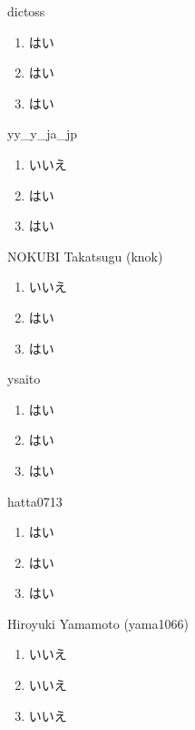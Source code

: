\begin{prework}{ dictoss }
  \begin{enumerate}
  \item はい
  \item はい
  \item はい
  \end{enumerate}
\end{prework}

\begin{prework}{ yy\_y\_ja\_jp }
  \begin{enumerate}
  \item いいえ
  \item はい
  \item はい
  \end{enumerate}
\end{prework}

\begin{prework}{ NOKUBI Takatsugu (knok) }
  \begin{enumerate}
  \item いいえ
  \item はい
  \item はい
  \end{enumerate}
\end{prework}

\begin{prework}{ ysaito }
  \begin{enumerate}
  \item はい
  \item はい
  \item はい
  \end{enumerate}
\end{prework}

\begin{prework}{ hatta0713 }
  \begin{enumerate}
  \item はい
  \item はい
  \item はい
  \end{enumerate}
\end{prework}

\begin{prework}{ Hiroyuki Yamamoto (yama1066) }
  \begin{enumerate}
  \item いいえ
  \item いいえ
  \item いいえ
  \end{enumerate}
\end{prework}

